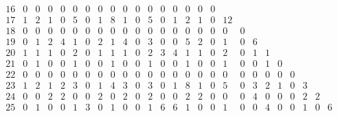 \begin{landscape}
\[\begin{array}{c|ccccccccccccccccccccccccc}
16&  0&  0&  0&  0&  0&  0&  0&  0&  0&  0&  0&  0&  0&  0&  0&  0&   &   &   &   &   &   &   &   &   \\
17&  1&  2&  1&  0&  5&  0&  1&  8&  1&  0&  5&  0&  1&  2&  1&  0& 12&   &   &   &   &   &   &   &   \\
18&  0&  0&  0&  0&  0&  0&  0&  0&  0&  0&  0&  0&  0&  0&  0&  0&  0&  0&   &   &   &   &   &   &   \\
19&  0&  1&  2&  4&  1&  0&  2&  1&  4&  0&  3&  0&  0&  5&  2&  0&  1&  0&  6&   &   &   &   &   &   \\
20&  1&  1&  1&  0&  2&  0&  1&  1&  1&  0&  2&  3&  4&  1&  1&  0&  2&  0&  1&  1&   &   &   &   &   \\
21&  0&  1&  0&  0&  1&  0&  0&  1&  0&  0&  1&  0&  0&  1&  0&  0&  1&  0&  0&  1&  0&   &   &   &   \\
22&  0&  0&  0&  0&  0&  0&  0&  0&  0&  0&  0&  0&  0&  0&  0&  0&  0&  0&  0&  0&  0&  0&   &   &   \\
23&  1&  2&  1&  2&  3&  0&  1&  4&  3&  0&  3&  0&  1&  8&  1&  0&  5&  0&  3&  2&  1&  0&  3&   &   \\
24&  0&  0&  2&  2&  0&  0&  2&  0&  2&  0&  2&  0&  0&  2&  2&  0&  0&  0&  4&  0&  0&  0&  2&  2&   \\
25&  0&  1&  0&  0&  1&  3&  0&  1&  0&  0&  1&  6&  6&  1&  0&  0&  1&  0&  0&  4&  0&  0&  1&  0&  6\\
\end{array}
\]


\end{landscape}
